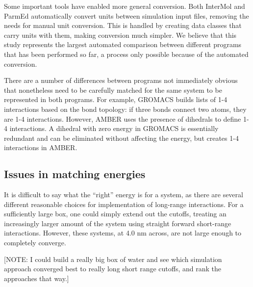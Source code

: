 Some important tools have enabled more general conversion. 
Both
InterMol and ParmEd automatically convert units between simulation
input files, removing the needs for manual unit conversion. This is
handled by creating data classes that carry units with them, making
conversion much simpler.  
We believe that this study represents the
largest automated comparison between different programs that has been
performed so far, a process only possible because of the automated
conversion.

There are a number of differences between programs not immediately
obvious that nonetheless need to be carefully matched for the same system to be represented in both programs.  For example,
GROMACS builds lists of 1-4 interactions based on the bond topology: if
three bonds connect two atoms, they are 1-4 interactions. However,
AMBER uses the presence of dihedrals to define 1-4 interactions. A
dihedral with zero energy in GROMACS is essentially redundant and can
be eliminated without affecting the energy, but creates 1-4
interactions in AMBER.

\subsection*{Issues in matching energies}

It is difficult to say what the ``right'' energy is for a system, as
there are several different reasonable choices for implementation of
long-range interactions. For a sufficiently large box, one could
simply extend out the cutoffs, treating an increasingly larger amount
of the system using straight forward short-range interactions.
However, these systems, at 4.0 nm across, are not large enough to
completely converge.

[NOTE: I could build a really big box of water and see which
  simulation approach converged best to really long short range
  cutoffs, and rank the approaches that way.]

